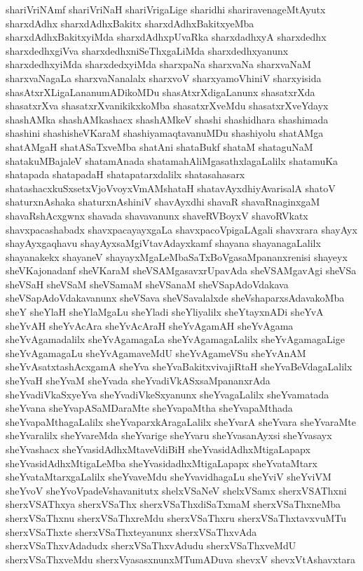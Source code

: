 {shariVriNAmf
shariVriNaH
shariVrigaLige
sharidhi
shariravenageMtAyutx
sharxdAdhx
sharxdAdhxBakitx
sharxdAdhxBakitxyeMba
sharxdAdhxBakitxyiMda
sharxdAdhxpUvaRka
sharxdadhxyA
sharxdedhx
sharxdedhxgiVva
sharxdedhxniSeThxgaLiMda
sharxdedhxyanunx
sharxdedhxyiMda
sharxdedxyiMda
sharxpaNa
sharxvaNa
sharxvaNaM
sharxvaNagaLa
sharxvaNanalalx
sharxvoV
sharxyamoVhiniV
sharxyisida
shasAtxrXLigaLananumADikoMDu
shasAtxrXdigaLanunx
shasatxrXda
shasatxrXva
shasatxrXvanikikxkoMba
shasatxrXveMdu
shasatxrXveYdayx
shashAMka
shashAMkashacx
shashAMkeV
shashi
shashidhara
shashimada
shashini
shashisheVKaraM
shashiyamaqtavanuMDu
shashiyolu
shatAMga
shatAMgaH
shatASaTxveMba
shatAni
shataBukf
shataM
shataguNaM
shatakuMBajaleV
shatamAnada
shatamahAliMgasathxlagaLalilx
shatamuKa
shatapada
shatapadaH
shatapatarxdalilx
shatasahasarx
shatashacxkuSxsetxVjoVvoyxVmAMshataH
shatavAyxdhiyAvarisalA
shatoV
shaturxnAshaka
shaturxnAshiniV
shavAyxdhi
shavaR
shavaRnaginxgaM
shavaRshAcxgwnx
shavada
shavavanunx
shaveRVBoyxV
shavoRVkatx
shavxpacashabadx
shavxpacayayxgaLa
shavxpacoVpigaLAgali
shavxrara
shayAyx
shayAyxgaqhavu
shayAyxsaMgiVtavAdayxkamf
shayana
shayanagaLalilx
shayanakekx
shayaneV
shayayxMgaLeMbaSaTxBoVgasaMpananxrenisi
shayeyx
sheVKajonadanf
sheVKaraM
sheVSAMgasavxrUpavAda
sheVSAMgavAgi
sheVSa
sheVSaH
sheVSaM
sheVSamaM
sheVSanaM
sheVSapAdoVdakava
sheVSapAdoVdakavanunx
sheVSava
sheVSavalalxde
sheVshaparxsAdavakoMba
sheY
sheYlaH
sheYlaMgaLu
sheYladi
sheYliyalilx
sheYtayxnADi
sheYvA
sheYvAH
sheYvAcAra
sheYvAcAraH
sheYvAgamAH
sheYvAgama
sheYvAgamadalilx
sheYvAgamagaLa
sheYvAgamagaLalilx
sheYvAgamagaLige
sheYvAgamagaLu
sheYvAgamaveMdU
sheYvAgameVSu
sheYvAnAM
sheYvAsatxtashAcxgamA
sheYva
sheYvaBakitxvivajiRtaH
sheYvaBeVdagaLalilx
sheYvaH
sheYvaM
sheYvada
sheYvadiVkASxsaMpananxrAda
sheYvadiVkaSxyeYva
sheYvadiVkeSxyanunx
sheYvagaLalilx
sheYvamatada
sheYvana
sheYvapASaMDaraMte
sheYvapaMtha
sheYvapaMthada
sheYvapaMthagaLalilx
sheYvaparxkAragaLalilx
sheYvarA
sheYvara
sheYvaraMte
sheYvaralilx
sheYvareMda
sheYvarige
sheYvaru
sheYvasanAyxsi
sheYvasayx
sheYvashacx
sheYvasidAdhxMtaveVdiBiH
sheYvasidAdhxMtigaLapapx
sheYvasidAdhxMtigaLeMba
sheYvasidadhxMtigaLapapx
sheYvataMtarx
sheYvataMtarxgaLalilx
sheYvaveMdu
sheYvavidhagaLu
sheYviV
sheYviVM
sheYvoV
sheYvoVpadeVshavanitutx
shelxVSaNeV
shelxVSamx
sherxVSAThxni
sherxVSAThxya
sherxVSaThx
sherxVSaThxdiSaTxmaM
sherxVSaThxneMba
sherxVSaThxnu
sherxVSaThxreMdu
sherxVSaThxru
sherxVSaThxtavxvuMTu
sherxVSaThxte
sherxVSaThxteyanunx
sherxVSaThxvAda
sherxVSaThxvAdadudx
sherxVSaThxvAdudu
sherxVSaThxveMdU
sherxVSaThxveMdu
sherxVyasasxnunxMTumADuva
shevxV
shevxVtAshavxtara
}
